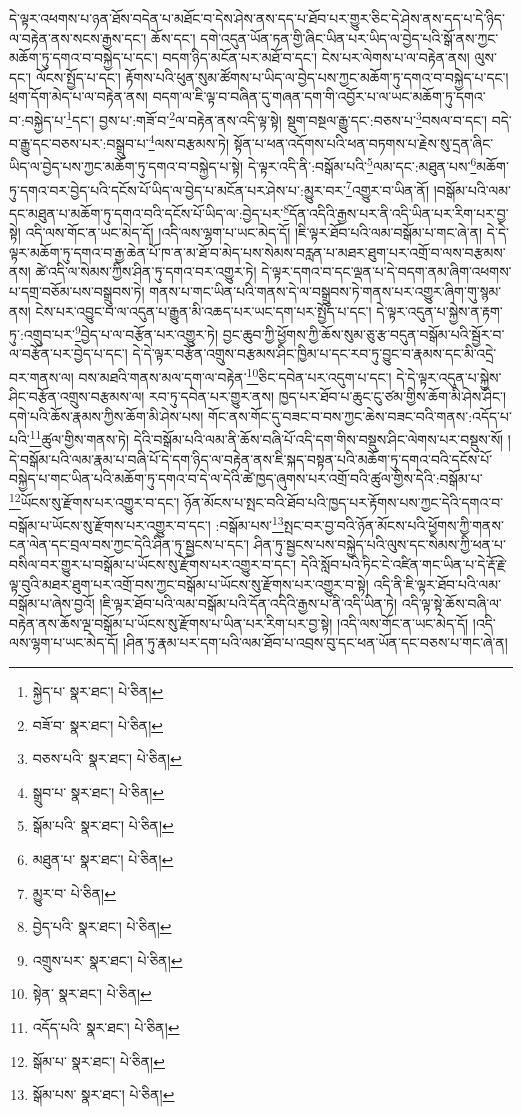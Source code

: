དེ་ལྟར་འཕགས་པ་ཉན་ཐོས་བདེན་པ་མཐོང་བ་དེས་ཤེས་ནས་དད་པ་ཐོབ་པར་གྱུར་ཅིང་དེ་ཤེས་ནས་དད་པ་དེ་ཉིད་ལ་བརྟེན་ནས་སངས་རྒྱས་དང་། ཆོས་དང་། དགེ་འདུན་ཡོན་ཏན་གྱི་ཞིང་ཡིན་པར་ཡིད་ལ་བྱེད་པའི་སྒོ་ནས་ཀྱང་མཆོག་ཏུ་དགའ་བ་བསྐྱེད་པ་དང་། བདག་ཉིད་མངོན་པར་མཐོ་བ་དང་། ངེས་པར་ལེགས་པ་ལ་བརྟེན་ནས། ལུས་དང་། ལོངས་སྤྱོད་པ་དང་། རྟོགས་པའི་ཕུན་སུམ་ཚོགས་པ་ཡིད་ལ་བྱེད་པས་ཀྱང་མཆོག་ཏུ་དགའ་བ་བསྐྱེད་པ་དང་། ཕྲག་དོག་མེད་པ་ལ་བརྟེན་ནས། བདག་ལ་ཇི་ལྟ་བ་བཞིན་དུ་གཞན་དག་གི་འབྱོར་པ་ལ་ཡང་མཆོག་ཏུ་དགའ་བ་:བསྐྱེད་པ་\footnote{སྐྱེད་པ་  སྣར་ཐང་།  པེ་ཅིན། }དང་། བྱས་པ་:གཟོ་བ་\footnote{བཟོ་བ་  སྣར་ཐང་།  པེ་ཅིན། }ལ་བརྟེན་ནས་འདི་ལྟ་སྟེ། སྡུག་བསྔལ་རྒྱུ་དང་:བཅས་པ་\footnote{བཅས་པའི་  སྣར་ཐང་།  པེ་ཅིན། }བསལ་བ་དང་། བདེ་བ་རྒྱུ་དང་བཅས་པར་:བསྒྲུབ་པ་\footnote{སྒྲུབ་པ་  སྣར་ཐང་།  པེ་ཅིན། }ལས་བརྩམས་ཏེ། སྟོན་པ་ཕན་འདོགས་པའི་ཕན་བཏགས་པ་རྗེས་སུ་དྲན་ཞིང་ཡིད་ལ་བྱེད་པས་ཀྱང་མཆོག་ཏུ་དགའ་བ་བསྐྱེད་པ་སྟེ། དེ་ལྟར་འདི་ནི་:བསྒོམ་པའི་\footnote{སྒོམ་པའི་  སྣར་ཐང་།  པེ་ཅིན། }ལམ་དང་:མཐུན་པས་\footnote{མཐུན་པ་  སྣར་ཐང་།  པེ་ཅིན། }མཆོག་ཏུ་དགའ་བར་བྱེད་པའི་དངོས་པོ་ཡིད་ལ་བྱེད་པ་མངོན་པར་ཤེས་པ་:མྱུར་བར་\footnote{མྱུར་བ་  པེ་ཅིན། }འགྱུར་བ་ཡིན་ནོ། །བསྒོམ་པའི་ལམ་དང་མཐུན་པ་མཆོག་ཏུ་དགའ་བའི་དངོས་པོ་ཡིད་ལ་:བྱེད་པར་\footnote{བྱེད་པའི་  སྣར་ཐང་།  པེ་ཅིན། }དོན་འདིའི་རྒྱས་པར་ནི་འདི་ཡིན་པར་རིག་པར་བྱ་སྟེ། འདི་ལས་གོང་ན་ཡང་མེད་དོ། །འདི་ལས་ལྷག་པ་ཡང་མེད་དོ། །ཇི་ལྟར་ཐོབ་པའི་ལམ་བསྒོམ་པ་གང་ཞེ་ན། དེ་དེ་ལྟར་མཆོག་ཏུ་དགའ་བ་རྒྱ་ཆེན་པོ་ཁ་ན་མ་ཐོ་བ་མེད་པས་སེམས་བརླན་པ་མཐར་ཐུག་པར་འགྲོ་བ་ལས་བརྩམས་ནས། ཚེ་འདི་ལ་སེམས་ཀྱིས་ཤིན་ཏུ་དགའ་བར་འགྱུར་ཏེ། དེ་ལྟར་དགའ་བ་དང་ལྡན་པ་དེ་བདག་ནམ་ཞིག་འཕགས་པ་དགྲ་བཅོམ་པས་བསྒྲུབས་ཏེ། གནས་པ་གང་ཡིན་པའི་གནས་དེ་ལ་བསྒྲུབས་ཏེ་གནས་པར་འགྱུར་ཞིག་གུ་སྙམ་ནས། ངེས་པར་འབྱུང་བ་ལ་འདུན་པ་རྒྱུན་མི་འཆད་པར་ཡང་དག་པར་སྤྱོད་པ་དང་། དེ་ལྟར་འདུན་པ་སྐྱེས་ན་རྟག་ཏུ་:འགྲུབ་པར་\footnote{འགྲུས་པར་  སྣར་ཐང་།  པེ་ཅིན། }བྱེད་པ་ལ་བརྩོན་པར་འགྱུར་ཏེ། བྱང་ཆུབ་ཀྱི་ཕྱོགས་ཀྱི་ཆོས་སུམ་ཅུ་རྩ་བདུན་བསྒོམ་པའི་སྦྱོར་བ་ལ་བརྩོན་པར་བྱེད་པ་དང་། དེ་དེ་ལྟར་བརྩོན་འགྲུས་བརྩམས་ཤིང་ཁྱིམ་པ་དང་རབ་ཏུ་བྱུང་བ་རྣམས་དང་མི་འདྲེ་བར་གནས་ལ། བས་མཐའི་གནས་མལ་དག་ལ་བརྟེན་\footnote{སྟེན་  སྣར་ཐང་།  པེ་ཅིན། }ཅིང་དབེན་པར་འདུག་པ་དང་། དེ་དེ་ལྟར་འདུན་པ་སྐྱེས་ཤིང་བརྩོན་འགྲུས་བརྩམས་ལ། རབ་ཏུ་དབེན་པར་གྱུར་ནས། ཁྱད་པར་ཐོབ་པ་ཆུང་ངུ་ཙམ་གྱིས་ཆོག་མི་ཤེས་ཤིང་། དགེ་པའི་ཆོས་རྣམས་ཀྱིས་ཆོག་མི་ཤེས་པས། གོང་ནས་གོང་དུ་བཟང་བ་བས་ཀྱང་ཆེས་བཟང་བའི་གནས་:འདོད་པ་པའི་\footnote{འདོད་པའི་  སྣར་ཐང་།  པེ་ཅིན། }ཚུལ་གྱིས་གནས་ཏེ། དེའི་བསྒོམ་པའི་ལམ་ནི་ཆོས་བཞི་པོ་འདི་དག་གིས་བསྡུས་ཤིང་ལེགས་པར་བསྡུས་སོ། །དེ་བསྒོམ་པའི་ལམ་རྣམ་པ་བཞི་པོ་དེ་དག་ཉིད་ལ་བརྟེན་ནས་ཇི་སྐད་བསྟན་པའི་མཆོག་ཏུ་དགའ་བའི་དངོས་པོ་བསྐྱེད་པ་གང་ཡིན་པའི་མཆོག་ཏུ་དགའ་བ་དེ་ལ་དེའི་ཚེ་ཁྱད་ཞུགས་པར་འགྲོ་བའི་ཚུལ་གྱིས་དེའི་:བསྒོམ་པ་\footnote{སྒོམ་པ་  སྣར་ཐང་།  པེ་ཅིན། }ཡོངས་སུ་རྫོགས་པར་འགྱུར་བ་དང་། ཉོན་མོངས་པ་སྤང་བའི་ཐོབ་པའི་ཁྱད་པར་རྟོགས་པས་ཀྱང་དེའི་དགའ་བ་བསྒོམ་པ་ཡོངས་སུ་རྫོགས་པར་འགྱུར་བ་དང་། :བསྒོམ་པས་\footnote{སྒོམ་པས་  སྣར་ཐང་།  པེ་ཅིན། }སྤང་བར་བྱ་བའི་ཉོན་མོངས་པའི་ཕྱོགས་ཀྱི་གནས་ངན་ལེན་དང་བྲལ་བས་ཀྱང་དེའི་ཤིན་ཏུ་སྦྱངས་པ་དང་། ཤིན་ཏུ་སྦྱངས་པས་བསྐྱེད་པའི་ལུས་དང་སེམས་ཀྱི་ཕན་པ་བསིལ་བར་གྱུར་པ་བསྒོམ་པ་ཡོངས་སུ་རྫོགས་པར་འགྱུར་བ་དང་། དེའི་སློབ་པའི་ཏིང་ངེ་འཛིན་གང་ཡིན་པ་དེ་རྡོ་རྗེ་ལྟ་བུའི་མཐར་ཐུག་པར་འགྲོ་བས་ཀྱང་བསྒོམ་པ་ཡོངས་སུ་རྫོགས་པར་འགྱུར་བ་སྟེ། འདི་ནི་ཇི་ལྟར་ཐོབ་པའི་ལམ་བསྒོམ་པ་ཞེས་བྱའོ། །ཇི་ལྟར་ཐོབ་པའི་ལམ་བསྒོམ་པའི་དོན་འདིའི་རྒྱས་པ་ནི་འདི་ཡིན་ཏེ། འདི་ལྟ་སྟེ་ཆོས་བཞི་ལ་བརྟེན་ནས་ཆོས་ལྔ་བསྒོམ་པ་ཡོངས་སུ་རྫོགས་པ་ཡིན་པར་རིག་པར་བྱ་སྟེ། །འདི་ལས་གོང་ན་ཡང་མེད་དོ། །འདི་ལས་ལྷག་པ་ཡང་མེད་དོ། །ཤིན་ཏུ་རྣམ་པར་དག་པའི་ལམ་ཐོབ་པ་འབྲས་བུ་དང་ཕན་ཡོན་དང་བཅས་པ་གང་ཞེ་ན། 